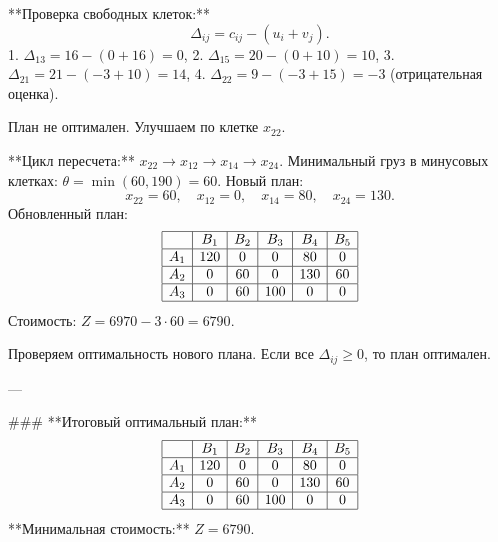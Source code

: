 **Проверка свободных клеток:**  
\[
\Delta_{ij} = c_{ij} - (u_i + v_j).
\]  
1. \( \Delta_{13} = 16 - (0 + 16) = 0 \),  
2. \( \Delta_{15} = 20 - (0 + 10) = 10 \),  
3. \( \Delta_{21} = 21 - (-3 + 10) = 14 \),  
4. \( \Delta_{22} = 9 - (-3 + 15) = -3 \) (отрицательная оценка).  

План не оптимален. Улучшаем по клетке \( x_{22} \).  

**Цикл пересчета:**  
\( x_{22} \rightarrow x_{12} \rightarrow x_{14} \rightarrow x_{24} \).  
Минимальный груз в минусовых клетках: \( \theta = \min(60, 190) = 60 \).  
Новый план:  
\[
x_{22} = 60, \quad x_{12} = 0, \quad x_{14} = 80, \quad x_{24} = 130.
\]  
Обновленный план:  
\[
\begin{array}{|c|c|c|c|c|c|}
\hline
 & B_1 & B_2 & B_3 & B_4 & B_5 \\
\hline
A_1 & 120 & 0 & 0 & 80 & 0 \\
\hline
A_2 & 0 & 60 & 0 & 130 & 60 \\
\hline
A_3 & 0 & 60 & 100 & 0 & 0 \\
\hline
\end{array}
\]  
Стоимость: \( Z = 6970 - 3 \cdot 60 = 6790 \).  

Проверяем оптимальность нового плана. Если все \( \Delta_{ij} \geq 0 \), то план оптимален.  

---

### **Итоговый оптимальный план:**  
\[
\begin{array}{|c|c|c|c|c|c|}
\hline
 & B_1 & B_2 & B_3 & B_4 & B_5 \\
\hline
A_1 & 120 & 0 & 0 & 80 & 0 \\
\hline
A_2 & 0 & 60 & 0 & 130 & 60 \\
\hline
A_3 & 0 & 60 & 100 & 0 & 0 \\
\hline
\end{array}
\]  
**Минимальная стоимость:** \( Z = 6790 \).